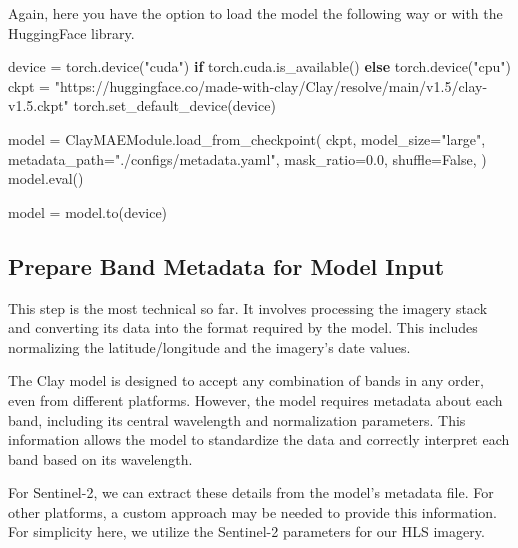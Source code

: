 \documentclass[
  letterpaper,
  DIV=11,
  numbers=noendperiod]{scrreprt}
\newenvironment{Shaded}{\begin{snugshade}}{\end{snugshade}}
\newcommand{\BuiltInTok}[1]{\textcolor[rgb]{0.00,0.23,0.31}{#1}}
\newcommand{\ControlFlowTok}[1]{\textcolor[rgb]{0.00,0.23,0.31}{\textbf{#1}}}
\newcommand{\FloatTok}[1]{\textcolor[rgb]{0.68,0.00,0.00}{#1}}
\newcommand{\NormalTok}[1]{\textcolor[rgb]{0.00,0.23,0.31}{#1}}
\newcommand{\OperatorTok}[1]{\textcolor[rgb]{0.37,0.37,0.37}{#1}}
\newcommand{\StringTok}[1]{\textcolor[rgb]{0.13,0.47,0.30}{#1}}
\newcommand{\VariableTok}[1]{\textcolor[rgb]{0.07,0.07,0.07}{#1}}
\begin{document}
Again, here you have the option to load the model the following way or
with the HuggingFace library.

\begin{Shaded}
\begin{Highlighting}[]
\NormalTok{device }\OperatorTok{=}\NormalTok{ torch.device(}\StringTok{"cuda"}\NormalTok{) }\ControlFlowTok{if}\NormalTok{ torch.cuda.is\_available() }\ControlFlowTok{else}\NormalTok{ torch.device(}\StringTok{"cpu"}\NormalTok{)}
\NormalTok{ckpt }\OperatorTok{=} \StringTok{"https://huggingface.co/made{-}with{-}clay/Clay/resolve/main/v1.5/clay{-}v1.5.ckpt"}
\NormalTok{torch.set\_default\_device(device)}

\NormalTok{model }\OperatorTok{=}\NormalTok{ ClayMAEModule.load\_from\_checkpoint(}
\NormalTok{    ckpt,}
\NormalTok{    model\_size}\OperatorTok{=}\StringTok{"large"}\NormalTok{,}
\NormalTok{    metadata\_path}\OperatorTok{=}\StringTok{"./configs/metadata.yaml"}\NormalTok{,}
\NormalTok{    mask\_ratio}\OperatorTok{=}\FloatTok{0.0}\NormalTok{,}
\NormalTok{    shuffle}\OperatorTok{=}\VariableTok{False}\NormalTok{,}
\NormalTok{)}
\NormalTok{model.}\BuiltInTok{eval}\NormalTok{()}

\NormalTok{model }\OperatorTok{=}\NormalTok{ model.to(device)}
\end{Highlighting}
\end{Shaded}

\subsection{Prepare Band Metadata for Model
Input}\label{prepare-band-metadata-for-model-input}

This step is the most technical so far. It involves processing the
imagery stack and converting its data into the format required by the
model. This includes normalizing the latitude/longitude and the
imagery's date values.

The Clay model is designed to accept any combination of bands in any
order, even from different platforms. However, the model requires
metadata about each band, including its central wavelength and
normalization parameters. This information allows the model to
standardize the data and correctly interpret each band based on its
wavelength.

For Sentinel-2, we can extract these details from the model's metadata
file. For other platforms, a custom approach may be needed to provide
this information. For simplicity here, we utilize the Sentinel-2
parameters for our HLS imagery.
\end{document}
